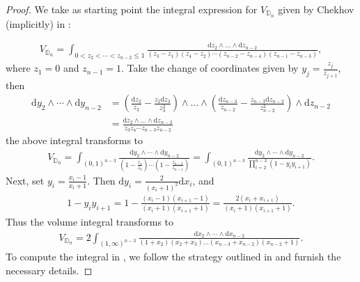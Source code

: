 \documentclass{amsart}
\theoremstyle{definition}
\begin{document}
\begin{proof}
We take as starting point the integral expression for $V_{\mathbb{D}_n}$ given by Chekhov (implicitly) in \cite[Proposition~6.2]{chekhov2024}:

\begin{align*}
    V_{\mathbb{D}_n}
    =
    \int_{0<z_2<\cdots<z_{n-2}\leqslant1}
    \frac{\mathrm{d}z_2\wedge\ldots\wedge\mathrm{d}z_{n-2}}
    {(z_3-z_1)(z_4-z_2)\cdots(z_{n-2}-z_{n-4})(z_{n-1}-z_{n-3})},
\end{align*}
where $z_1=0$ and $z_{n-1}=1$. Take the change of coordinates given by $y_j=\frac{z_j}{z_{j+1}}$, then
\begin{align*}
\mathrm{d}y_2\wedge\cdots\wedge\mathrm{d}y_{n-2}
&=
(\tfrac{\mathrm{d}z_2}{z_3}-\tfrac{z_2\mathrm{d}z_3}{z_3^2})
\wedge\ldots\wedge
(\tfrac{\mathrm{d}z_{n-3}}{z_{n-2}}-\tfrac{z_{n-3}\mathrm{d}z_{n-2}}{z_{n-2}^2})
\wedge
\mathrm{d}z_{n-2}\\
&=
\frac{\mathrm{d}z_2\wedge\ldots\wedge\mathrm{d}z_{n-2}}
{z_3z_4\cdots z_{n-3} z_{n-2}}
\end{align*}
the above integral transforms to
\begin{align*}
V_{\mathbb{D}_n}
=\int_{(0,1)^{n-3}} \frac{\mathrm{d}y_2\wedge\cdots\wedge \mathrm{d}y_{n-2}}
{(1-\frac{z_1}{z_3})\cdots(1-\frac{z_{n-3}}{z_{n-1}})}
= \int_{(0,1)^{n-3}} \frac{\mathrm{d}y_2\wedge\cdots\wedge \mathrm{d}y_{n-2}}{\prod_{i=2}^{n-3}(1-y_iy_{i+1})}.
\end{align*}
Next, set $y_i = \frac{x_i-1}{x_i+1}$. Then $\mathrm{d}y_i = \frac{2}{(x_i+1)^2} \mathrm{d}x_i$, and
\begin{align*}
    1-y_i y_{i+1} = 1 - \frac{(x_i-1)(x_{i+1}-1)}{(x_i+1)(x_{i+1}+1)} = \frac{2(x_i+x_{i+1})}{(x_i+1)(x_{i+1}+1)}.
\end{align*}
Thus the volume integral transforms to
\begin{align}
\label{eq:vol-n-gon-int}
    V_{\mathbb{D}_n}
=2\int_{(1,\infty)^{n-3}} \frac{\mathrm{d}x_2\wedge\cdots\wedge \mathrm{d}x_{n-2}}{(1+x_2)(x_2+x_3)\dotsc(x_{n-3}+x_{n-2})(x_{n-2}+1)}.
\end{align}
To compute the integral in , we follow the strategy outlined in \cite{MO402985} and furnish the necessary details.


\end{proof}
\end{document}
